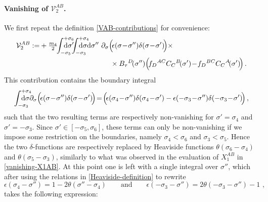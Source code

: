 \documentclass[12pt]{article}
\numberwithin{equation}{section}
\begin{document}
\paragraph{Vanishing of $\mathcal{V}_{2}^{AB}$.} 
We first repeat the definition \eqref{VAB-contributions} for convenience:
\begin{equation}\label{calV2-appendix}
\begin{aligned}
\mathcal{V}_{2}^{AB}:=&+\tfrac{m_{4}}{2} \!\! \int_{-\sigma_{5}}^{+\sigma_{6}}\!\!\!\!\!\!\!\!\!\!\mathrm{d}\sigma' \!\!\! \int_{-\sigma_{3}}^{+\sigma_{4}}\!\!\!\!\!\!\!\!\!\!\mathrm{d}\sigma\mathrm{d}\sigma'' \,\,  \partial_{\sigma}\Bigl(\!\epsilon(\sigma\!-\!\sigma'')\delta(\sigma\!-\!\sigma')\!\Bigr) \times
\\
& \qquad \qquad \qquad \qquad \qquad \times B_{\tau}{}^{D}\!(\sigma'')\Bigl(\!f_{D}{}^{AC}C_{C}{}^{B}\!(\sigma')\!-\!f_{D}{}^{BC}C_{C}{}^{A}\!(\sigma')\!\Bigr) \, .
\end{aligned}
\end{equation}
This contribution contains the boundary integral
\begin{equation}
\begin{aligned}
\int_{-\sigma_{3}}^{+\sigma_{4}}\!\!\!\!\!\!\!\!\!\!\mathrm{d}\sigma \partial_{\sigma}\Bigl(\!\epsilon(\sigma\!-\!\sigma'')\delta(\sigma\!-\!\sigma')\!\Bigr)\!=\!
 \Bigl(\!\epsilon(\sigma_{4}\!-\!\sigma'')\delta(\sigma_{4}\!-\!\sigma')-\epsilon(-\sigma_{3}\!-\!\sigma'')\delta(-\sigma_{3}\!-\!\sigma')\!\Bigr) \, ,
\end{aligned}
\end{equation}
such that the two resulting terms are respectively non-vanishing for $\sigma'=\sigma_{4}$ and $\sigma'=-\sigma_{3}$. Since $\sigma'\in[-\sigma_{5},\sigma_{6}]$, these terms can only be non-vanishing if we impose some restriction on the boundaries, namely $\sigma_{4}<\sigma_{6}$ and $\sigma_{3}<\sigma_{5}$. Hence the two $\delta$-functions are respectively replaced by Heaviside functions $\theta(\sigma_{6}-\sigma_{4})$ and $\theta(\sigma_{5}-\sigma_{3})$, similarly to what was observed in the evaluation of $X_{1}^{AB}$ in \eqref{vanishing-X1AB}. At this point one is left with a single integral over $\sigma''$, which after using the relations in \eqref{Heaviside-definition} to rewrite
\begin{equation}
\epsilon(\sigma_{4}-\sigma'')=1-2\theta(\sigma''-\sigma_{4}) 
\qquad \text{and} \qquad 
\epsilon(-\sigma_{3}-\sigma'')=2\theta(-\sigma_{3}-\sigma'')-1 \,\, ,
\end{equation}
takes the following expression: 
\end{document}

